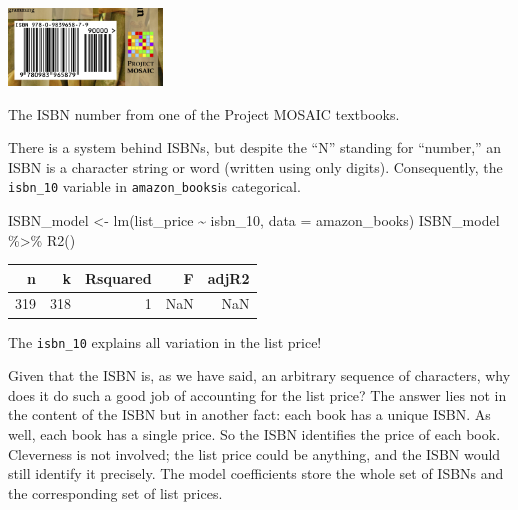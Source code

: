 \documentclass[
  letterpaper,
  DIV=11,
  numbers=noendperiod,
  oneside]{scrreprt}
\newenvironment{Shaded}{\begin{snugshade}}{\end{snugshade}}
\newcommand{\AttributeTok}[1]{\textcolor[rgb]{0.40,0.45,0.13}{#1}}
\newcommand{\FunctionTok}[1]{\textcolor[rgb]{0.28,0.35,0.67}{#1}}
\newcommand{\NormalTok}[1]{\textcolor[rgb]{0.00,0.23,0.31}{#1}}
\newcommand{\OtherTok}[1]{\textcolor[rgb]{0.00,0.23,0.31}{#1}}
\newcommand{\SpecialCharTok}[1]{\textcolor[rgb]{0.37,0.37,0.37}{#1}}
\begin{document}
\begin{marginfigure}

{\centering \includegraphics[width=1.61in,height=\textheight]{./www/SM2-ISBN.png}

}

\caption{\label{fig-isbn-sm2}The ISBN number from one of the Project
MOSAIC textbooks.}

\end{marginfigure}

There is a system behind ISBNs, but despite the ``N'' standing for
``number,'' an ISBN is a character string or word (written using only
digits). Consequently, the \texttt{isbn\_10} variable in
\texttt{amazon\_books}is categorical.

\begin{Shaded}
\begin{Highlighting}[]
\NormalTok{ISBN\_model }\OtherTok{\textless{}{-}} \FunctionTok{lm}\NormalTok{(list\_price }\SpecialCharTok{\textasciitilde{}}\NormalTok{ isbn\_10, }\AttributeTok{data =}\NormalTok{ amazon\_books)}
\NormalTok{ISBN\_model }\SpecialCharTok{\%\textgreater{}\%} \FunctionTok{R2}\NormalTok{()}
\end{Highlighting}
\end{Shaded}

\ttfamily 
\begin{tabular}{rrrrr}
\toprule
n & k & Rsquared & F & adjR2\\
\midrule
319 & 318 & 1 & NaN & NaN\\
\bottomrule
\end{tabular} \normalfont
\bigskip

The \texttt{isbn\_10} explains all variation in the list price!

Given that the ISBN is, as we have said, an arbitrary sequence of
characters, why does it do such a good job of accounting for the list
price? The answer lies not in the content of the ISBN but in another
fact: each book has a unique ISBN. As well, each book has a single
price. So the ISBN identifies the price of each book. Cleverness is not
involved; the list price could be anything, and the ISBN would still
identify it precisely. The model coefficients store the whole set of
ISBNs and the corresponding set of list prices.
\end{document}
